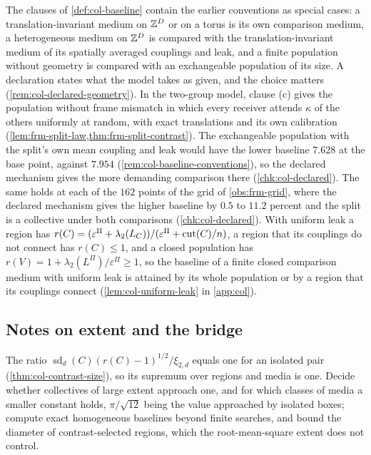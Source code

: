 The clauses of \cref{def:col-baseline} contain the earlier conventions as special cases: a translation-invariant medium on $\mathbb{Z}^D$ or on a torus is its own comparison medium, a heterogeneous medium on $\mathbb{Z}^D$ is compared with the translation-invariant medium of its spatially averaged couplings and leak, and a finite population without geometry is compared with an exchangeable population of its size. A declaration states what the model takes as given, and the choice matters (\cref{rem:col-declared-geometry}). In the two-group model, clause (c) gives the population without frame mismatch in which every receiver attends $\kappa$ of the others uniformly at random, with exact translations and its own calibration (\cref{lem:frm-split-law,thm:frm-split-contrast}). The exchangeable population with the split's own mean coupling and leak would have the lower baseline $7.628$ at the base point, against $7.954$ (\cref{rem:col-baseline-conventions}), so the declared mechanism gives the more demanding comparison there (\cref{chk:col-declared}). The same holds at each of the $162$ points of the grid of \cref{obs:frm-grid}, where the declared mechanism gives the higher baseline by $0.5$ to $11.2$ percent and the split is a collective under both comparisons (\cref{chk:col-declared}). With uniform leak a region has $r(C)=(\varepsilon^\Pi+\lambda_2(L_C))/(\varepsilon^\Pi+\operatorname{cut}(C)/n)$, a region that its couplings do not connect has $r(C)\le1$, and a closed population has $r(V)=1+\lambda_2(L^\Pi)/\varepsilon^\Pi\ge1$, so the baseline of a finite closed comparison medium with uniform leak is attained by its whole population or by a region that its couplings connect (\cref{lem:col-uniform-leak} in \cref{app:col}).

\subsection{Notes on extent and the bridge}\label{sup:col-notes-on-extent-and-the-bridge}

\begin{openproblem}\label{open:col-extent}
The ratio $\operatorname{sd}_d(C)(r(C)-1)^{1/2}/\xi_{2,d}$ equals one for an isolated pair (\cref{thm:col-contrast-size}), so its supremum over regions and media is one. Decide whether collectives of large extent approach one, and for which classes of media a smaller constant holds, $\pi/\sqrt{12}$ being the value approached by isolated boxes; compute exact homogeneous baselines beyond finite searches, and bound the diameter of contrast-selected regions, which the root-mean-square extent does not control.
\end{openproblem}

